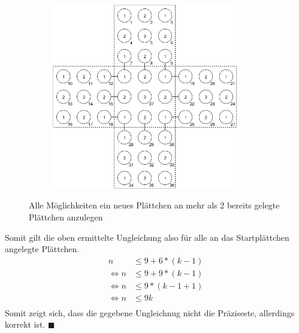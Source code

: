 \documentclass{article}
\newcommand*{\qed}{\hfill\ensuremath{\blacksquare}\\}%
\begin{document}
\begin{figure}[H]
\begin{subfigure}{.5\textwidth}
	\end{subfigure}%
	\begin{subfigure}{.5\textwidth}
		\centering
		\includegraphics[width=0.9\textwidth]{aufgabe2_5.png}
	\end{subfigure}
	\caption{Alle M\"oglichkeiten ein neues Pl\"attchen an mehr als 2 bereits gelegte Pl\"attchen anzulegen}
\end{figure}
Somit gilt die oben ermittelte Ungleichung also f\"ur alle an das Startpl\"attchen angelegte Pl\"attchen.
\begin{align*}
n &\leq 9 + 6*(k-1)\\
\Leftrightarrow n &\leq 9 + 9*(k-1)\\
\Leftrightarrow n &\leq 9*(k-1+1)\\ 
\Leftrightarrow n &\leq 9k\\
\end{align*}
Somit zeigt sich, dass die gegebene Ungleichnug nicht die Pr\"aziseste, allerdings korrekt ist.
\qed

\newpage
\end{document}
